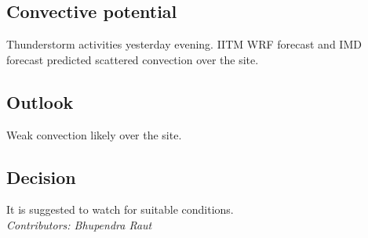 \subsection*{Convective potential}
Thunderstorm  activities yesterday evening. IITM WRF forecast and IMD forecast predicted scattered convection over the site. 

\subsection*{Outlook}
Weak convection likely over the site.\\
\subsection*{Decision}
It is suggested to watch for suitable conditions. \\ 



\textit{Contributors: Bhupendra Raut} 

